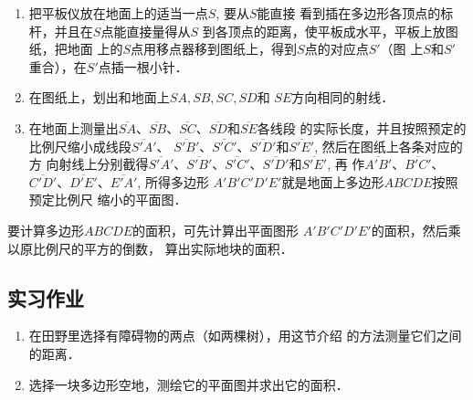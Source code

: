 \begin{enumerate}
    \item 把平板仪放在地面上的适当一点$S$, 要从$S$能直接
看到插在多边形各顶点的标杆，并且在$S$点能直接量得从$S$
到各顶点的距离，使平板成水平，平板上放图纸，把地面
上的$S$点用移点器移到图纸上，得到$S$点的对应点$S'$（图
上$S$和$S'$重合），在$S'$点插一根小针．

\item 在图纸上，划出和地面上$SA,SB,SC,SD$和
$SE$方向相同的射线．
\item 在地面上测量出$\overline{SA}$、$\overline{SB}$、$\overline{SC}$、$\overline{SD}$和$\overline{SE}$各线段
的实际长度，并且按照预定的比例尺缩小成线段$\overline{S'A'}$、
$\overline{S'B'}$、$\overline{S'C'}$、$\overline{S'D'}$和$\overline{S'E'}$, 然后在图纸上各条对应的方
向射线上分别截得$\overline{S'A'}$、$\overline{S'B'}$、$\overline{S'C'}$、$\overline{S'D'}$和$\overline{S'E'}$, 再
作$\overline{A'B'}$、$\overline{B'C'}$、$\overline{C'D'}$、$\overline{D'E'}$、$\overline{E'A'}$, 所得多边形
$A'B'C'D'E'$就是地面上多边形$ABCDE$按照预定比例尺
缩小的平面图．
\end{enumerate}

要计算多边形$ABCDE$的面积，可先计算出平面图形
$A'B'C'D'E'$的面积，然后乘以原比例尺的平方的倒数，
算出实际地块的面积．































\subsection*{实习作业}
\begin{enumerate}
    \item 在田野里选择有障碍物的两点（如两棵树），用这节介绍
    的方法测量它们之间的距离．
    \item 选择一块多边形空地，测绘它的平面图并求出它的面积．
\end{enumerate}

